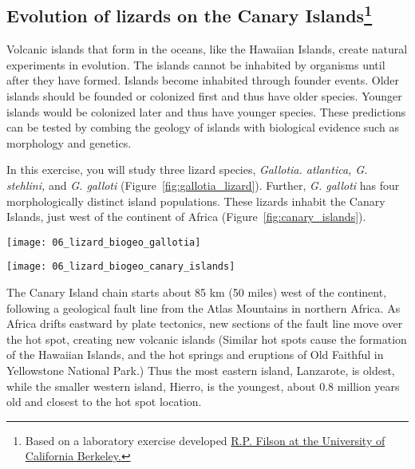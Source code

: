 \documentclass[12pt, hidelinks]{exam}
\begin{document}
\subsection*{Evolution of lizards on the Canary Islands\footnote{Based on a laboratory exercise developed \href{http://www.ucmp.berkeley.edu/fosrec/Filson.html}{R.P. Filson at the University of California Berkeley.}}}

Volcanic islands that form in the oceans, like the Hawaiian Islands, create natural experiments in evolution. The islands cannot be inhabited by organisms until after they have formed. Islands become inhabited through founder events. Older islands should be founded or colonized first and thus have older species. Younger islands would be colonized later and thus have younger species. These predictions can be tested by combing the geology of islands with biological evidence such as morphology and genetics.

In this exercise, you will study three lizard species, \textit{Gallotia. atlantica, G. stehlini,} and \textit{G. galloti} (Figure~\ref{fig:gallotia_lizard}). Further, \textit{G. galloti} has four morphologically distinct island populations. These lizards inhabit the Canary Islands, just west of the continent of Africa (Figure~\ref{fig:canary_islands}).

\begin{multicols}{2}

	\begin{center}
		\texttt{[image: 06\_lizard\_biogeo\_gallotia]}
		
	\end{center}
\columnbreak
	
	\begin{center}
	
		\texttt{[image: 06\_lizard\_biogeo\_canary\_islands]}
	
	\end{center}
\end{multicols}

The Canary Island chain starts
about 85 km (50 miles) west of the continent, following a geological fault line from
the Atlas Mountains in northern Africa. As Africa drifts eastward by plate tectonics, 
new sections of the fault line move over the hot spot, creating new volcanic islands
 (Similar hot spots cause the formation of the Hawaiian Islands, and the hot springs and eruptions of Old Faithful in Yellowstone National Park.) Thus
the most eastern island, Lanzarote, is oldest, while the smaller western
island, Hierro, is the youngest, about 0.8 million years old and closest to the hot spot location.
\end{document}
